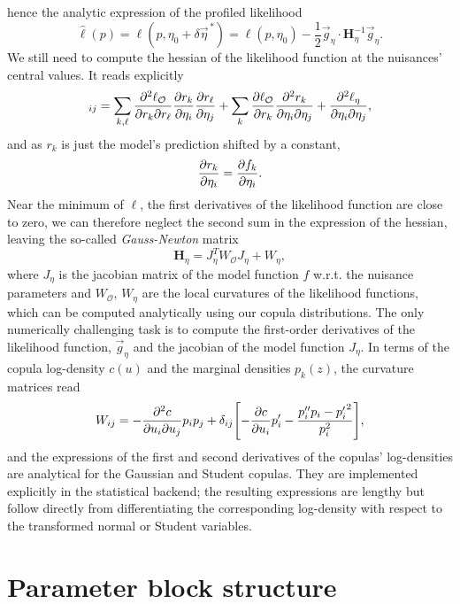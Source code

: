 \documentclass[preprint,11pt]{elsarticle}
\begin{document}
hence the analytic expression of the profiled likelihood
\begin{equation}
    \hat\ell(p)=\ell(p,\eta_0+\delta{\vec\eta}^{\,*})=\ell(p,\eta_0)-\frac{1}{2}\vec g_\eta\cdot\mathbf{H}_\eta^{-1}\vec g_\eta.
\end{equation}
We still need to compute the hessian of the likelihood function at the nuisances' central values. It reads explicitly
\begin{equation}
    [\mathbf{H}_\eta]_{ij}=\sum_{k,\ell}\pdv{\ell_\mathcal{O}}{r_k}{r_\ell}\pdv{r_k}{\eta_i}\pdv{r_\ell}{\eta_j}+\sum_{k}\pdv{\ell_{\mathcal{O}}}{r_k}\pdv{r_k}{\eta_i}{\eta_j}+\pdv{\ell_\eta}{\eta_i}{\eta_j},
\end{equation}
and as $r_k$ is just the model's prediction shifted by a constant,
\begin{equation}
    \pdv{r_k}{\eta_i}=\pdv{f_k}{\eta_i}.
\end{equation}
Near the minimum of $\ell$, the first derivatives of the likelihood function are close to zero, we can therefore neglect the second sum in the expression of the hessian, leaving the so-called \textit{Gauss-Newton} matrix
\begin{equation}
    \mathbf{H}_\eta=J_\eta^TW_{\mathcal{O}}J_\eta+W_\eta,
\end{equation}
where $J_\eta$ is the jacobian matrix of the model function $f$ w.r.t. the nuisance parameters and $W_{\mathcal{O}}$, $W_\eta$ are the local curvatures of the likelihood functions, which can be computed analytically using our copula distributions. The only numerically challenging task is to compute the first-order derivatives of the likelihood function, $\vec g_\eta$ and the jacobian of the model function $J_\eta$. \smallbreak
In terms of the copula log-density $c(u)$ and the marginal densities $p_k(z)$, the curvature matrices read
\begin{equation}
    W_{ij}=-\pdv{c}{u_i}{u_j}p_ip_j+\delta_{ij}\qty[-\pdv{c}{u_i}p'_i-\frac{p''_ip_i-{p_i'}^2}{p_i^2}],
\end{equation}
and the expressions of the first and second derivatives of the copulas' log-densities are analytical for the Gaussian and Student copulas. They are implemented explicitly in the statistical backend; the resulting expressions are lengthy but follow directly from differentiating the corresponding log-density with respect to the transformed normal or Student variables.


\section{Parameter block structure}\label{app:block_structure}
\end{document}
